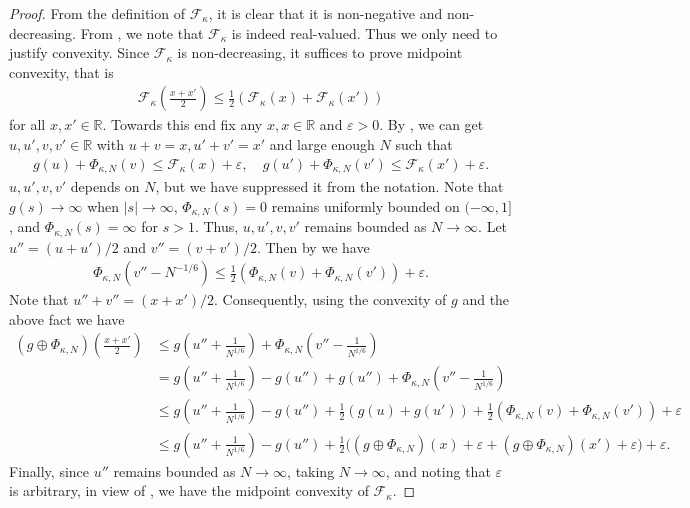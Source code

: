 \documentclass[reqno,11pt]{amsart}
\newcommand{\e}{\varepsilon}
\numberwithin{equation}{section}
\theoremstyle{definition}
\newcommand{\R}{\mathbb{R}}
\begin{document}
\begin{proof} From the definition of $\mathcal{F}_\kappa$, it is clear that it is non-negative and non-decreasing. From , we note that $\mathcal{F}_\kappa$ is indeed real-valued. Thus we only need to justify convexity. Since $\mathcal{F}_\kappa$ is non-decreasing, it suffices to prove midpoint convexity, that is
\begin{align*}
     \mathcal{F}_\kappa\left(\frac{x+x'}{2} \right) \le \frac12\left(\mathcal{F}_\kappa(x)+\mathcal{F}_\kappa(x')\right)
 \end{align*}
 for all $x,x'\in \R$. Towards this end fix any $x,x\in \R$ and $\e>0$. By , we can get $u,u',v,v'\in \R$ with $u+v=x, u'+v'=x'$ and large enough $N$ such that
 \begin{align*}
     g(u)+\Phi_{\kappa,N}(v) \le \mathcal{F}_\kappa(x)+\e, \quad g(u')+\Phi_{\kappa,N}(v') \le \mathcal{F}_\kappa(x')+\e. 
 \end{align*}
 $u, u', v, v'$ depends on $N$, but we have suppressed it from the notation. Note that $g(s) \to \infty$ when $|s|\to \infty$, $\Phi_{\kappa,N}(s)=0$ remains uniformly bounded on $(-\infty,1]$, and $\Phi_{\kappa,N}(s)=\infty$ for $s>1$. Thus, $u,u',v,v'$ remains bounded as $N \to \infty$.  Let $u''=(u+u')/2$ and $v''=(v+v')/2$. Then by  we have
 \begin{align*}
     \Phi_{\kappa,N}\left(v''-N^{-1/6}\right) \le \frac12\left(\Phi_{\kappa,N}\left(v\right)+\Phi_{\kappa,N}\left(v'\right)\right)+\e.
 \end{align*}
 Note that $u''+v''=(x+x')/2$. Consequently, using the convexity of $g$ and the above fact we have
\begin{equation*}
		\begin{split}
			\left( g \oplus \Phi_{\kappa,N} \right)  \left(\frac{x+x'}{2} \right) &\le g(u''+\tfrac1{N^{1/6}}) + \Phi_{\kappa,N}(v''-\tfrac1{N^{1/6}})
			\\ & = g(u''+\tfrac1{N^{1/6}})-g(u'')+g(u'') + \Phi_{\kappa,N}(v''-\tfrac1{N^{1/6}})
			\\
			&
			\le g(u''+\tfrac1{N^{1/6}})-g(u'')+\frac{1}{2}(g(u) + g(u')) + \frac{1}{2} \left( \Phi_{\kappa,N}(v) + \Phi_{\kappa,N}(v') \right) + \varepsilon
			\\
			&
			\le g(u''+\tfrac1{N^{1/6}})-g(u'')+\frac{1}{2} \bigg( \left(g \oplus \Phi_{\kappa,N} \right) (x) + \varepsilon + \left(g \oplus \Phi_{\kappa,N} \right) (x') + \varepsilon \bigg) + \varepsilon.
		\end{split}
	\end{equation*}
Finally, since $u''$ remains bounded as $N\to \infty$, taking $N\to \infty$, and noting that $\e$ is arbitrary,  in view of , we have the midpoint convexity of $\mathcal{F}_\kappa$.
 \end{proof}
\end{document}
